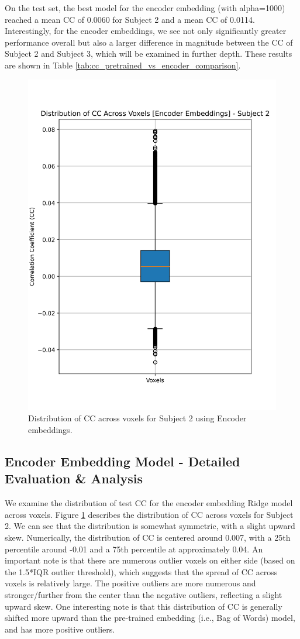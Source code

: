 \documentclass[10pt,letterpaper]{article}
\begin{document}
On the test set, the best model for the encoder embedding (with alpha=1000) reached a mean CC of 0.0060 for Subject 2 and a mean CC of 0.0114. Interestingly, for the encoder embeddings, we see not only significantly greater performance overall but also a larger difference in magnitude between the CC of Subject 2 and Subject 3, which will be examined in further depth. These results are shown in Table \ref{tab:cc_pretrained_vs_encoder_comparison}.


\begin{figure}[ht]
    \centering
    \includegraphics[width=0.5\linewidth]{figs/encoder_subj2_cc_dist.png}
    \caption{Distribution of CC across voxels for Subject 2 using Encoder embeddings.}
    \label{fig:cc_dist_encoder_subject_2}
\end{figure}

\subsection{Encoder Embedding Model - Detailed Evaluation \& Analysis}
We examine the distribution of test CC for the encoder embedding Ridge model across voxels. Figure \ref{fig:cc_dist_encoder_subject_2} describes the distribution of CC across voxels for Subject 2. We can see that the distribution is somewhat symmetric, with a slight upward skew. Numerically, the distribution of CC is centered around 0.007, with a 25th percentile around -0.01 and a 75th percentile at approximately 0.04. An important note is that there are numerous outlier voxels on either side (based on the 1.5*IQR outlier threshold), which suggests that the spread of CC across voxels is relatively large. The positive outliers are more numerous and stronger/further from the center than the negative outliers, reflecting a slight upward skew. One interesting note is that this distribution of CC is generally shifted more upward than the pre-trained embedding (i.e., Bag of Words) model, and has more positive outliers.
\end{document}
